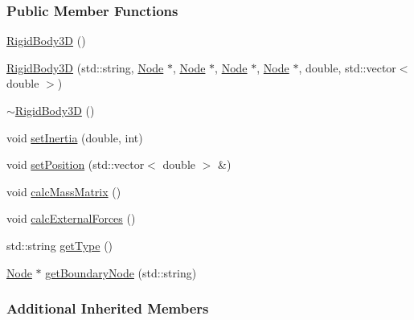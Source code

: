 \subsubsection*{Public Member Functions}
\begin{DoxyCompactItemize}
\item 
\hyperlink{classmknix_1_1_rigid_body3_d_a7132ea2cee0893fa935fccb25cf314f9}{Rigid\-Body3\-D} ()
\item 
\hyperlink{classmknix_1_1_rigid_body3_d_a2bafc82c39bdd654b7577b69170a00ca}{Rigid\-Body3\-D} (std\-::string, \hyperlink{classmknix_1_1_node}{Node} $\ast$, \hyperlink{classmknix_1_1_node}{Node} $\ast$, \hyperlink{classmknix_1_1_node}{Node} $\ast$, \hyperlink{classmknix_1_1_node}{Node} $\ast$, double, std\-::vector$<$ double $>$)
\item 
\hyperlink{classmknix_1_1_rigid_body3_d_a34e8faafa4f7be677eca2b1400f85863}{$\sim$\-Rigid\-Body3\-D} ()
\item 
void \hyperlink{classmknix_1_1_rigid_body3_d_aa76bf1fe9fe4783d647d84c925540515}{set\-Inertia} (double, int)
\item 
void \hyperlink{classmknix_1_1_rigid_body3_d_ac69cc57cafc9c9783da8d7e66124151d}{set\-Position} (std\-::vector$<$ double $>$ \&)
\item 
void \hyperlink{classmknix_1_1_rigid_body3_d_a257d9b0bb9fe27664227270cd73194a4}{calc\-Mass\-Matrix} ()
\item 
void \hyperlink{classmknix_1_1_rigid_body3_d_a66bff0110ce5d201875f068050c84c96}{calc\-External\-Forces} ()
\item 
std\-::string \hyperlink{classmknix_1_1_rigid_body3_d_a3cdb37910a3ed061017926d67932ad06}{get\-Type} ()
\item 
\hyperlink{classmknix_1_1_node}{Node} $\ast$ \hyperlink{classmknix_1_1_rigid_body3_d_abd7a5b8547154b5b56c30d87f9ce0e65}{get\-Boundary\-Node} (std\-::string)
\end{DoxyCompactItemize}
\subsubsection*{Additional Inherited Members}


